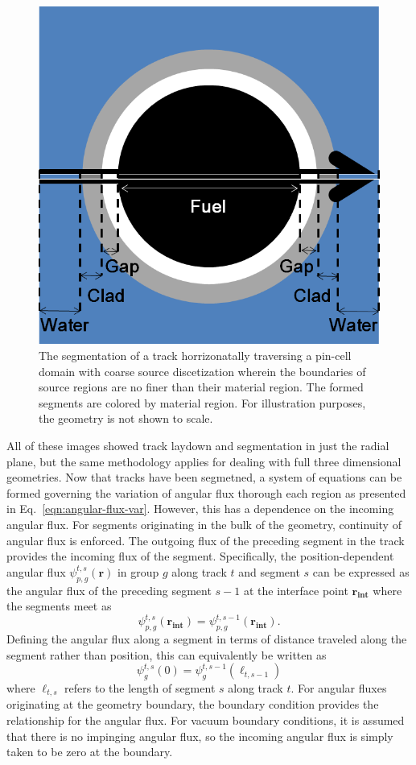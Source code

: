 \begin{figure}[h!]
	\centering
	\includegraphics[width=0.6\linewidth]{figures/segmentation.PNG}
	\caption[]{The segmentation of a track horrizonatally traversing a pin-cell domain with coarse source discetization wherein the boundaries of source regions are no finer than their material region. The formed segments are colored by material region. For illustration purposes, the geometry is not shown to scale.}
	\label{fig:segmentation}
\end{figure}

All of these images showed track laydown and segmentation in just the radial plane, but the same methodology applies for dealing with full three dimensional geometries. Now that tracks have been segmetned, a system of equations can be formed governing the variation of angular flux thorough each region as presented in Eq.~\ref{eqn:angular-flux-var}. However, this has a dependence on the incoming angular flux. For segments originating in the bulk of the geometry, continuity of angular flux is enforced. The outgoing flux of the preceding segment in the track provides the incoming flux of the segment. Specifically, the position-dependent angular flux $\psi_{p,g}^{t,s}(\mathbf{r})$ in group $g$ along track $t$ and segment $s$ can be expressed as the angular flux of the preceding segment $s-1$ at the interface point $\mathbf{r_{\textbf{int}}}$ where the segments meet as
\begin{dmath}
	\psi_{p,g}^{t,s}(\mathbf{r_{\textbf{int}}}) = \psi_{p,g}^{t,s-1}(\mathbf{r_{\textbf{int}}}).
\end{dmath}
Defining the angular flux along a segment in terms of distance traveled along the segment rather than position, this can equivalently be written as
\begin{dmath}
	\psi_g^{t,s}(0) = \psi_g^{t,s-1}(\ell_{t,s-1})
	\label{eqn:angular_flux_boundary}
\end{dmath}
where $\ell_{t,s}$ refers to the length of segment $s$ along track $t$. For angular fluxes originating at the geometry boundary, the boundary condition provides the relationship for the angular flux. For vacuum boundary conditions, it is assumed that there is no impinging angular flux, so the incoming angular flux is simply taken to be zero at the boundary. 

